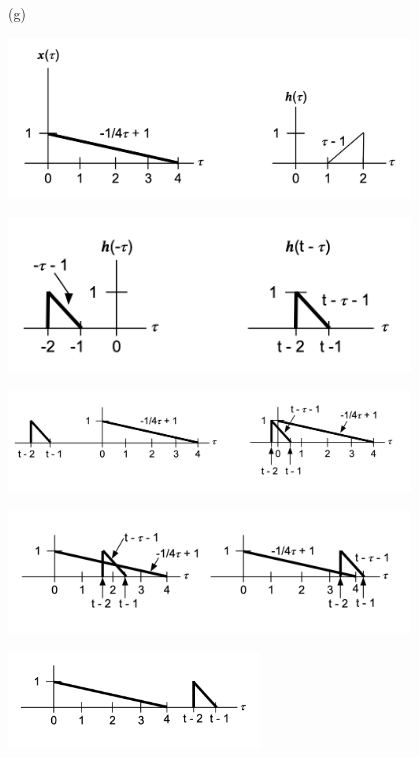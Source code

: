 \documentclass{article}
\begin{document}
(g)
\begin{center}
    \includegraphics[width=0.8\textwidth]{43g1.png}
\end{center}
\begin{center}
    \includegraphics[width=0.8\textwidth]{43g2.png}
\end{center}
\begin{center}
    \includegraphics[width=0.8\textwidth]{43g3.png}
\end{center}
\begin{center}
    \includegraphics[width=0.8\textwidth]{43g4.png}
\end{center}
\begin{center}
    \includegraphics[width=0.5\textwidth]{43g5.png}
\end{center}
\end{document}
